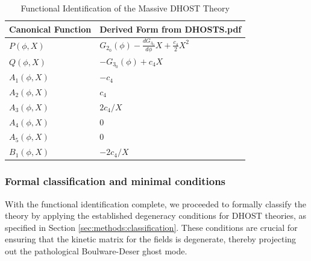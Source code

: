 \documentclass[twocolumn]{aastex631}
\begin{document}
\begin{table}[t]
\caption{Functional Identification of the Massive DHOST Theory}
\label{tab:functional_identification}
\centering
\begin{tabular}{|l|l|}
\hline
\textbf{Canonical Function} & \textbf{Derived Form from DHOSTS.pdf} \\
\hline
$P(\phi,X)$ & $G_{2_0}(\phi) - \frac{dG_{3_0}}{d\phi} X + \frac{c_4}{2} X^2$ \\
$Q(\phi,X)$ & $-G_{3_0}(\phi) + c_4 X$ \\
$A_1(\phi,X)$ & $-c_4$ \\
$A_2(\phi,X)$ & $c_4$ \\
$A_3(\phi,X)$ & $2c_4/X$ \\
$A_4(\phi,X)$ & $0$ \\
$A_5(\phi,X)$ & $0$ \\
$B_1(\phi,X)$ & $-2c_4/X$ \\
\hline
\end{tabular}
\end{table}

\subsubsection{Formal classification and minimal conditions}
With the functional identification complete, we proceeded to formally classify the theory by applying the established degeneracy conditions for DHOST theories, as specified in Section \ref{sec:methods:classification}. These conditions are crucial for ensuring that the kinetic matrix for the fields is degenerate, thereby projecting out the pathological Boulware-Deser ghost mode.
\end{document}
